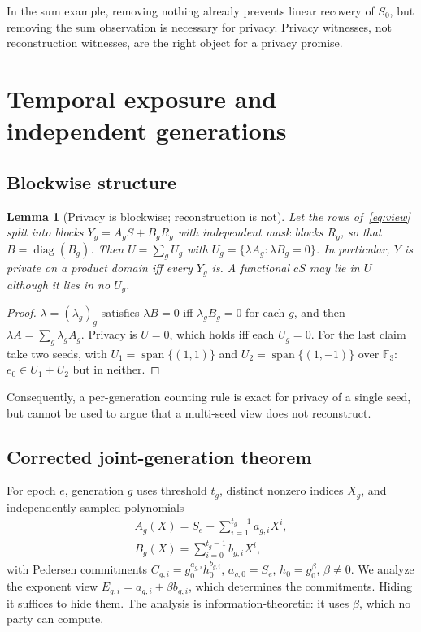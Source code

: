 \documentclass[pdflatex,sn-mathphys-num,twocolumn]{sn-jnl}
\theoremstyle{plain}
\newtheorem{lemma}[theorem]{Lemma}
\theoremstyle{definition}
\newcommand{\F}{\mathbb{F}}
\begin{document}
In the sum example, removing nothing already prevents linear recovery of $S_0$, but removing the sum observation is necessary for privacy. Privacy witnesses, not reconstruction witnesses, are the right object for a privacy promise.


\section{Temporal exposure and independent generations}\label{sec:temporal}

\subsection{Blockwise structure}
\begin{lemma}[Privacy is blockwise; reconstruction is not]\label{lem:block}
Let the rows of~\eqref{eq:view} split into blocks $Y_g=A_gS+B_gR_g$ with independent mask blocks $R_g$, so that $B=\operatorname{diag}(B_g)$. Then $U=\sum_gU_g$ with $U_g=\{\lambda A_g:\lambda B_g=0\}$. In particular, $Y$ is private on a product domain iff every $Y_g$ is. A functional $cS$ may lie in $U$ although it lies in no $U_g$.
\end{lemma}
\begin{proof}
$\lambda=(\lambda_g)_g$ satisfies $\lambda B=0$ iff $\lambda_gB_g=0$ for each $g$, and then $\lambda A=\sum_g\lambda_gA_g$. Privacy is $U=0$, which holds iff each $U_g=0$. For the last claim take two seeds, with $U_1=\operatorname{span}\{(1,1)\}$ and $U_2=\operatorname{span}\{(1,-1)\}$ over $\F_3$: $e_0\in U_1+U_2$ but in neither.
\end{proof}

Consequently, a per-generation counting rule is exact for privacy of a single seed, but cannot be used to argue that a multi-seed view does not reconstruct.

\subsection{Corrected joint-generation theorem}
For epoch $e$, generation $g$ uses threshold $t_g$, distinct nonzero indices $X_g$, and independently sampled polynomials
\begin{equation}\label{eq:sharing}
\begin{gathered}
 A_g(X)=S_e+\sum_{i=1}^{t_g-1}a_{g,i}X^i,\\
 B_g(X)=\sum_{i=0}^{t_g-1}b_{g,i}X^i,
\end{gathered}
\end{equation}
with Pedersen commitments $C_{g,i}=g_0^{a_{g,i}}h_0^{b_{g,i}}$, $a_{g,0}=S_e$, $h_0=g_0^\beta$, $\beta\ne0$. We analyze the exponent view $E_{g,i}=a_{g,i}+\beta b_{g,i}$, which determines the commitments. Hiding it suffices to hide them. The analysis is information-theoretic: it uses $\beta$, which no party can compute.
\end{document}
